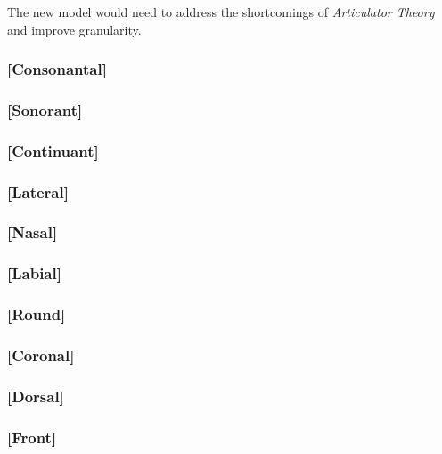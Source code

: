 \documentclass[10pt,letterpaper]{article}
\begin{document}
The new model would need to address the shortcomings of \emph{Articulator Theory} and improve granularity.

\subsubsection{[Consonantal]}
\label{ssub:feature_consonantal}

\subsubsection{[Sonorant]}
\label{ssub:feature_sonorant}

\subsubsection{[Continuant]}
\label{ssub:feature_continuant}

\subsubsection{[Lateral]}
\label{ssub:feature_lateral}

\subsubsection{[Nasal]}
\label{ssub:feature_nasal}

\subsubsection{[Labial]}
\label{ssub:feature_labial}

\subsubsection{[Round]}
\label{ssub:feature_round}

\subsubsection{[Coronal]}
\label{ssub:feature_coronal}

\subsubsection{[Dorsal]}
\label{ssub:feature_dorsal}

\subsubsection{[Front]}
\label{ssub:feature_front}
\end{document}
